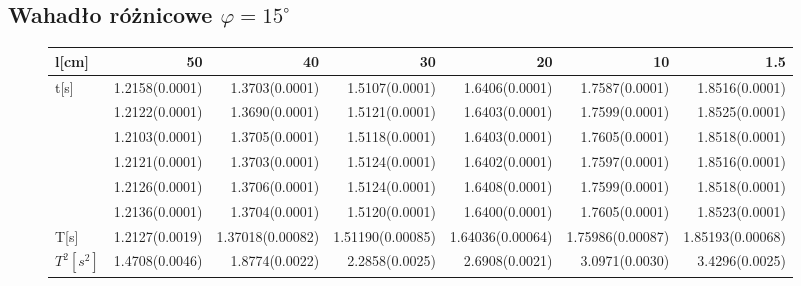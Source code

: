 \documentclass[a4paper,10pt]{article}
\begin{document}
\subsection{Wahadło różnicowe $\varphi = 15^\circ$}
\begin{figure}[H]
\begin{adjustwidth}{-2cm}{}
\begin{tabular}{lrrrrrr}
\toprule
l[cm] &  50 &  40 &   30 &   20 &   10 &  1.5 \\
\midrule
t[s] &  1.2158(0.0001) &  1.3703(0.0001) &  1.5107(0.0001) &  1.6406(0.0001) &  1.7587(0.0001) &  1.8516(0.0001) \\
 &  1.2122(0.0001)&1.3690(0.0001)&1.5121(0.0001)&  1.6403(0.0001) &  1.7599(0.0001) &  1.8525(0.0001) \\
 &  1.2103(0.0001)&1.3705(0.0001)&1.5118(0.0001)&  1.6403(0.0001) &  1.7605(0.0001) &  1.8518(0.0001) \\
 &  1.2121(0.0001)&1.3703(0.0001)&1.5124(0.0001)&  1.6402(0.0001) &  1.7597(0.0001) &  1.8516(0.0001) \\
 &  1.2126(0.0001)&1.3706(0.0001)&1.5124(0.0001)&  1.6408(0.0001) &  1.7599(0.0001) &  1.8518(0.0001) \\
 &  1.2136(0.0001)&1.3704(0.0001)&1.5120(0.0001)&  1.6400(0.0001) &  1.7605(0.0001) &  1.8523(0.0001) \\\hline
T[s] &  1.2127(0.0019) & 1.37018(0.00082)  & 1.51190(0.00085)  & 1.64036(0.00064)  & 1.75986(0.00087)  
& 1.85193(0.00068) & \\\hline
$T^2[s^2]$ &  1.4708(0.0046) & 1.8774(0.0022)  & 2.2858(0.0025)  & 2.6908(0.0021)  & 3.0971(0.0030)  & 3.4296(0.0025) & \\
\bottomrule
\end{tabular}
 \end{adjustwidth}
\end{figure}
\end{document}
